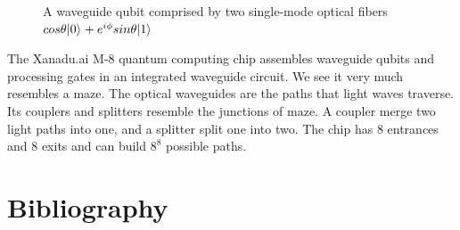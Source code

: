 \documentclass[oneside, letter, 12pt]{book}
\begin{document}
\begin{figure}[h]\label{Fiber}
\caption{A waveguide qubit comprised by two single-mode optical fibers $cos{\theta} \vert {0} \rangle_{} + e^{i \phi} sin{\theta} \vert {1} \rangle_{}$}
\end{figure}

The Xanadu.ai M-8 quantum computing chip assembles waveguide qubits and processing gates in an integrated waveguide circuit. We see it very much resembles a maze. The optical waveguides are the paths that light waves traverse. Its couplers and splitters resemble the junctions of maze. A coupler merge two light paths into one, and a splitter split one into two. The chip has 8 entrances and 8 exits and can build $8^8$ possible paths.


\chapter*{Bibliography}

   

\printindex
\end{document}
